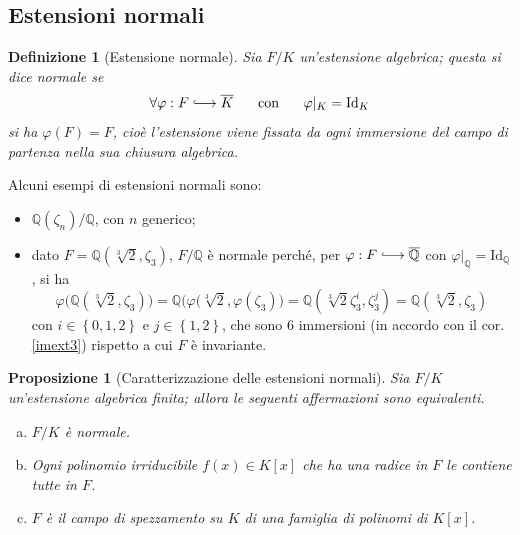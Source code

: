 \documentclass[12pt]{scrartcl}
\theoremstyle{style}
\newtheorem{definizione}{Definizione}[section]
\newtheorem{prop}{Proposizione}[section]
\numberwithin{equation}{subsection}
\newcommand{\longhookrightarrow}{\lhook\joinrel\longrightarrow}
\begin{document}
\subsection{Estensioni normali}
\begin{definizione}
	[Estensione normale]
Sia $F / K$ un'estensione algebrica; questa si dice \textit{normale} se 
\[
\forall \varphi : F \longhookrightarrow \overline{K} \hspace{.5cm} \text{ con }\hspace{.5cm} \varphi |_K = \mathrm{Id} _K
\] 
si ha $\varphi (F) = F$, cio\`e l'estensione viene fissata da ogni immersione del campo di partenza nella sua chiusura algebrica.
\end{definizione}
\noindent Alcuni esempi di estensioni normali sono:
\begin{itemize}
	\item $\mathbb{Q}(\zeta_n) / \mathbb{Q}$, con $n$ generico;
	\item dato $F = \mathbb{Q}(\sqrt[3]{2},\zeta_3) $, $F / \mathbb{Q}$ \`e normale perch\'e, per $\varphi : F \longhookrightarrow \overline{\mathbb{Q}}$ con $\varphi |_{\mathbb{Q}}=\mathrm{Id} _{\mathbb{Q}}  $, si ha 
		\[
			\varphi \big(\mathbb{Q}(\sqrt[3]{2} , \zeta_3)\big) = \mathbb{Q}\big(\varphi (\sqrt[3]{2} , \varphi (\zeta_3)\big) = \mathbb{Q}(\sqrt[3]{2}\zeta_3^i, \zeta_3^j) = \mathbb{Q}(\sqrt[3]{2} , \zeta_3)
		\] 
		con $i \in \left\{ 0,1,2 \right\} $ e $j \in \left\{ 1,2 \right\} $, che sono $6$ immersioni (in accordo con il cor. \ref{imext3}) rispetto a cui $F$ \`e invariante.
\end{itemize}
\begin{prop}[Caratterizzazione delle estensioni normali]\label{nextcar}
	Sia $F / K$ un'estensione algebrica finita; allora le seguenti affermazioni sono equivalenti.
	\begin{enumerate}[(a).]
		\item $F / K$ \`e normale.
		\item Ogni polinomio irriducibile $f(x) \in K[x]$ che ha una radice in $F$ le contiene tutte in $F$.
		\item $F$ \`e il campo di spezzamento su $K$ di una famiglia di polinomi di $K[x]$.
	\end{enumerate}
\end{prop}
\end{document}
